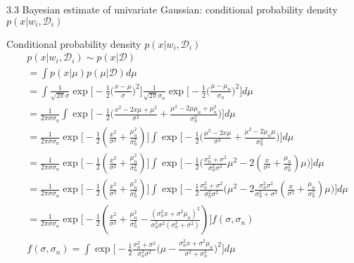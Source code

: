 \documentclass[compress,blue]{beamer}
\newcommand{\calD}{\mathcal{D}}
\begin{document}
\begin{frame}{3.3 Bayesian estimate of univariate Gaussian: conditional probability density $p(x | w_i, \calD_i)$}
	\vspace{-0.1in}
	\begin{block}{Conditional probability density $p(x | w_i, \calD_i)$}
		\vspace{-0.15in}
		\tiny
		\begin{align}
			& p(x|w_i, \calD_i) \sim p(x | \calD) \\
			& = \int p(x|\mu) p(\mu | \calD) d\mu \\
			& = \int \frac{1}{\sqrt{2\pi}\sigma}\exp\Big[-\frac{1}{2}\Big(\frac{x-\mu}{\sigma}\Big)^2\Big]\frac{1}{\sqrt{2\pi}\sigma_n}\exp\Big[-\frac{1}{2}\Big(\frac{\mu-\mu_n}{\sigma_n}\Big)^2\Big]d\mu \\
			& =\frac{1}{2\pi\sigma\sigma_n}\int\exp\Big[-\frac{1}{2}\Big(\frac{x^2-2x\mu+\mu^2}{\sigma^2} + \frac{\mu^2-2\mu\mu_n + \mu_n^2}{\sigma_n^2}\Big)\Big]d\mu\\
			& =\frac{1}{2\pi\sigma\sigma_n}\exp\Big[-\frac{1}{2}(\frac{x^2}{\sigma^2}+\frac{\mu_n^2}{\sigma_n^2})\Big]\int\exp\Big[-\frac{1}{2}\Big(\frac{\mu^2-2x\mu}{\sigma^2} + \frac{\mu^2-2\mu_n\mu}{\sigma^2_n}\Big)\Big]d\mu\\
			&=\frac{1}{2\pi\sigma\sigma_n}\exp\Big[-\frac{1}{2}(\frac{x^2}{\sigma^2}+\frac{\mu_n^2}{\sigma_n^2})\Big]\int\exp\Big[-\frac{1}{2}\Big(\frac{\sigma_n^2 + \sigma^2}{\sigma_n^2\sigma^2}\mu^2 - 2(\frac{x}{\sigma^2} + \frac{\mu_n}{\sigma_n^2})\mu\Big)\Big]d\mu\\
			&=\frac{1}{2\pi\sigma\sigma_n}\exp\Big[-\frac{1}{2}(\frac{x^2}{\sigma^2}+\frac{\mu_n^2}{\sigma_n^2})\Big]\int\exp\Big[-\frac{1}{2}\frac{\sigma_n^2 + \sigma^2}{\sigma_n^2\sigma^2}\Big(\mu^2 - 2\frac{\sigma_n^2\sigma^2}{\sigma_n^2 + \sigma^2}(\frac{x}{\sigma^2} + \frac{\mu_n}{\sigma_n^2})\mu\Big)\Big]d\mu\\
			&=\frac{1}{2\pi\sigma\sigma_n}\exp\Big[-\frac{1}{2}(\frac{x^2}{\sigma^2}+\frac{\mu_n^2}{\sigma_n^2} - \frac{(\sigma_n^2 x + \sigma^2\mu_n)^2}{\sigma^2_n\sigma^2(\sigma_n^2+\sigma^2)})\Big]f(\sigma, \sigma_n)\\
			&f(\sigma, \sigma_n) = \int\exp\Big[-\frac{1}{2}\frac{\sigma_n^2 + \sigma^2}{\sigma_n^2\sigma^2}\Big(\mu - \frac{\sigma_n^2 x + \sigma^2\mu_n}{\sigma^2 + \sigma_n^2}\Big)^2\Big]d\mu \nonumber
		\end{align}
		\normalsize
	\end{block}
\end{frame}
\end{document}

